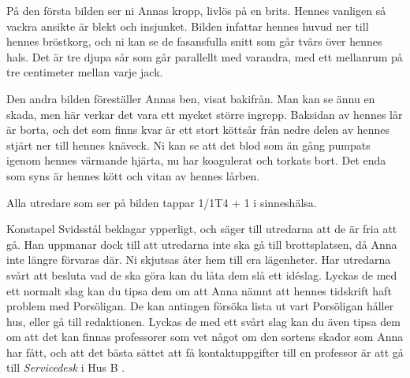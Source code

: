 \begin{displayquote}
	På den första bilden ser ni Annas kropp, livlös på en brits. Hennes vanligen så vackra ansikte är blekt och insjunket. Bilden infattar hennes huvud ner till hennes bröstkorg, och ni kan se de fasansfulla snitt som går tvärs över hennes hals. Det är tre djupa sår som går parallellt med varandra, med ett mellanrum på tre centimeter mellan varje jack.

	Den andra bilden föreställer Annas ben, visat bakifrån. Man kan se ännu en skada, men här verkar det vara ett mycket större ingrepp. Baksidan av hennes lår är borta, och det som finns kvar är ett stort köttsår från nedre delen av hennes stjärt ner till hennes knäveck. Ni kan se att det blod som än gång pumpats igenom hennes värmande hjärta, nu har koagulerat och torkats bort. Det enda som syns är hennes kött och vitan av hennes lårben.
\end{displayquote}
%
Alla utredare som ser på bilden tappar 1/1T4 + 1 i sinneshälsa. 

Konstapel Svidsstål beklagar ypperligt, och säger till utredarna att de är fria att gå. Han uppmanar dock till att utredarna inte ska gå till brottsplatsen, då Anna inte längre förvaras där. Ni skjutsas åter hem till era lägenheter. Har utredarna svårt att besluta vad de ska göra kan du låta dem slå ett idéslag. Lyckas de med ett normalt slag kan du tipsa dem om att Anna nämnt att hennes tidskrift haft problem med Porsöligan. De kan antingen försöka lista ut vart Porsöligan håller hus, eller gå till redaktionen. Lyckas de med ett svårt slag kan du även tipsa dem om att det kan finnas professorer som vet något om den sortens skador som Anna har fått, och att det bästa sättet att få kontaktuppgifter till en professor är att gå till \textit{Servicedesk} i Hus B \sectiondescribe{\ref{loc:Servicedesk}}.
